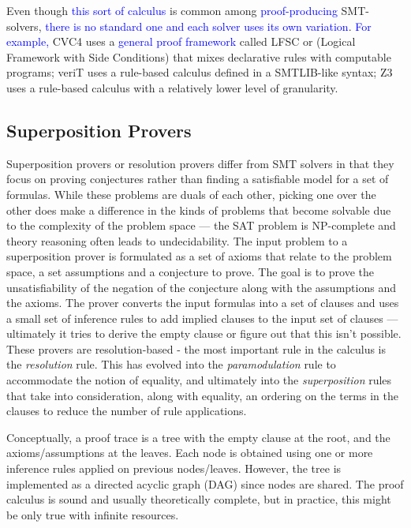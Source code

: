 \documentclass{article}
\newcommand{\ed}[1]{\textcolor{blue}{#1}}
\begin{document}
	Even though \ed{this sort of calculus} is common among 
	\ed{proof-producing} SMT-solvers, 
	\ed{there is no standard one and each solver uses its own variation}.
	\ed{For example,}
	CVC4 \ed{\cite{cvc4}} uses a \ed{general proof framework} 
	called LFSC or (Logical Framework with Side Conditions) 
	that mixes declarative rules with computable programs; 
	veriT\ed{\cite{verit}} uses a rule-based calculus defined in a 
	SMTLIB-like syntax; Z3 \ed{\cite{z3}} uses a rule-based calculus with 
	a relatively lower level of granularity.
	
	\subsection{Superposition Provers}
	\label{sup}
	Superposition provers or resolution provers differ 
	from SMT solvers in that they focus on proving 
	conjectures rather than finding a satisfiable model
	for a set of formulas. While these problems are 
	duals of each other, picking one over the other 
	does make a difference in the kinds of problems 
	that become solvable due to the complexity of 
	the problem space --- the SAT problem is NP-complete
	and theory reasoning often leads to undecidability.
	The input problem to a superposition prover is 
	formulated as a set of axioms that relate to the 
	problem space, a set assumptions and a conjecture 
	to prove. The goal is to prove the unsatisfiability 
	of the negation of the conjecture along with the 
	assumptions and the axioms. The prover converts 
	the input formulas into a set of clauses and 
	uses a small set of inference rules to add 
	implied clauses to the input set of 
	clauses --- ultimately it tries to derive 
	the empty clause or figure out that this 
	isn't possible. These provers are resolution-based -
	the most important rule in the calculus is the 
	\textit{resolution} rule. This has evolved into 
	the \textit{paramodulation} rule to accommodate 
	the notion of equality, and ultimately into 
	the \textit{superposition} rules that take into 
	consideration, along with equality, an ordering 
	on the terms in the clauses to reduce the number 
	of rule applications.
	
	Conceptually, a proof trace is a tree with the empty 
	clause at the root, and the axioms/assumptions at 
	the leaves. Each node is obtained using one or more 
	inference rules applied on previous nodes/leaves. 
	However, the tree is implemented as a directed 
	acyclic graph (DAG) since nodes are shared. The 
	proof calculus is sound and usually theoretically 
	complete, but in practice, this might be only true 
	with infinite resources.
	
\end{document}
